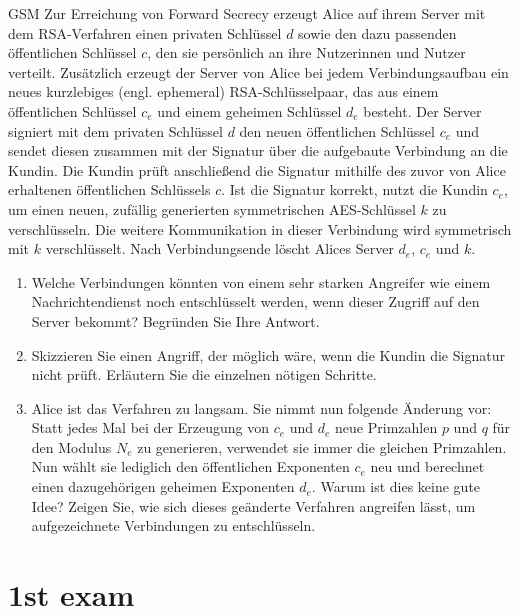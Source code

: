 \documentclass{article}
\begin{document}
\begin{exercise}{GSM}
  Zur Erreichung von Forward Secrecy erzeugt Alice auf ihrem Server mit dem RSA-Verfahren einen privaten Schlüssel $d$ sowie den dazu passenden öffentlichen Schlüssel $c$, den sie persönlich an ihre Nutzerinnen und Nutzer verteilt. Zusätzlich erzeugt der Server von Alice bei jedem Verbindungsaufbau ein neues kurzlebiges (engl. ephemeral) RSA-Schlüsselpaar, das aus einem öffentlichen Schlüssel $c_e$ und einem geheimen Schlüssel $d_e$ besteht. Der Server signiert mit dem privaten Schlüssel $d$ den neuen öffentlichen Schlüssel $c_e$ und sendet diesen zusammen mit der Signatur über die aufgebaute Verbindung an die Kundin. Die Kundin prüft anschließend die Signatur mithilfe des zuvor von Alice erhaltenen öffentlichen Schlüssels $c$. Ist die Signatur korrekt, nutzt die Kundin $c_e$, um einen neuen, zufällig generierten symmetrischen AES-Schlüssel $k$ zu verschlüsseln. Die weitere Kommunikation in dieser Verbindung wird symmetrisch mit $k$ verschlüsselt. Nach Verbindungsende löscht Alices Server $d_e$, $c_e$ und $k$.

  \begin{enumerate}
    \item Welche Verbindungen könnten von einem sehr starken Angreifer wie einem Nachrichtendienst noch entschlüsselt werden, wenn dieser Zugriff auf den Server bekommt? Begründen Sie Ihre Antwort.
    \item Skizzieren Sie einen Angriff, der möglich wäre, wenn die Kundin die Signatur nicht prüft. Erläutern Sie die einzelnen nötigen Schritte.
    \item Alice ist das Verfahren zu langsam. Sie nimmt nun folgende Änderung vor: Statt jedes Mal bei der Erzeugung von $c_e$ und $d_e$ neue Primzahlen $p$ und $q$ für den Modulus $N_e$ zu generieren, verwendet sie immer die gleichen Primzahlen. Nun wählt sie lediglich den öffentlichen Exponenten $c_e$ neu und berechnet einen dazugehörigen geheimen Exponenten $d_e$. Warum ist dies keine gute Idee? Zeigen Sie, wie sich dieses geänderte Verfahren angreifen lässt, um aufgezeichnete Verbindungen zu entschlüsseln.
  \end{enumerate}

  \begin{solution}
  \end{solution}
\end{exercise}



\setcounter{section}{2021}
\section{1st exam}
\end{document}
